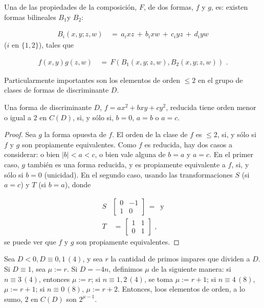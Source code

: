 Una de las propiedades de la composici\'{o}n, $F$, de dos formas,
$f$ y $g$, es: existen formas bilineales $B_{1}$y $B_{2}$:

\begin{align*}
B_{i}(x,y;z,w) & \,=\, a_{i}xz\,+\,b_{i}xw\,+\,
c_{i}yz\,+\,d_{i}yw
\end{align*}
($i$ en $\{1,2\}$), tales que

\begin{align*}
f(x,y)g(z,w) & \,=\,F(B_{1}(x,y;z,w),B_{2}(x,y;z,w))
\text{ .}
\end{align*}

Particularmente importantes son los elementos de orden $\leq 2$ en
el grupo de clases de formas de discriminante $D$.

\begin{definicionesLemaFormasDeOrdenDos}
Una forma de discriminante $D$, $f=ax^{2}+bxy+cy^{2}$, reducida
tiene orden menor o igual a $2$ en $C(D)$, si, y s\'{o}lo si,
$b=0$, $a=b$ o $a=c$.
\end{definicionesLemaFormasDeOrdenDos}

\begin{proof}
Sea $g$ la forma opuesta de $f$. El orden de la clase de $f$ es
$\leq 2$, si, y s\'{o}lo si $f$ y $g$ son propiamente equivalentes.
Como $f$ es reducida, hay dos casos a considerar: o bien
$|b|<a<c$, o bien vale alguna de $b=a$ y $a=c$. En el primer caso,
$g$ tambi\'{e}n es una forma reducida, y es propiamente equivalente a
$f$, si, y s\'{o}lo si $b=0$ (unicidad).
En el segundo caso, usando las transformaciones $S$ (si $a=c$)
y $T$ (si $b=a$), donde

\begin{align*}
S & \begin{bmatrix}0&-1\\1&0\end{bmatrix}\,=\,
\text{ y}\\
T & \,=\, \begin{bmatrix}1&1\\0&1\end{bmatrix}
\text{ ,}
\end{align*}
se puede ver que $f$ y $g$ son propiamente equivalentes.
\end{proof}

\begin{definicionesPropoFormasDeOrdenDos}
Sea $D<0,D\equiv 0,1\,(4)$, y sea $r$ la cantidad de primos impares
que dividen a $D$. Si $D\equiv 1$, sea $\mu:=r$. Si $D=-4n$, definimos $\mu$ de la siguiente manera: si $n\equiv 3\,(4)$, entonces $\mu:=r$;
si $n\equiv 1,2\,(4)$, se toma $\mu:=r+1$; si $n\equiv 4\,(8)$,
$\mu:=r+1$; si $n\equiv 0\,(8)$, $\mu:=r+2$. Entonces, loos
elementos de orden, a lo sumo, $2$ en $C(D)$ son $2^{\mu-1}$.
\end{definicionesPropoFormasDeOrdenDos}

